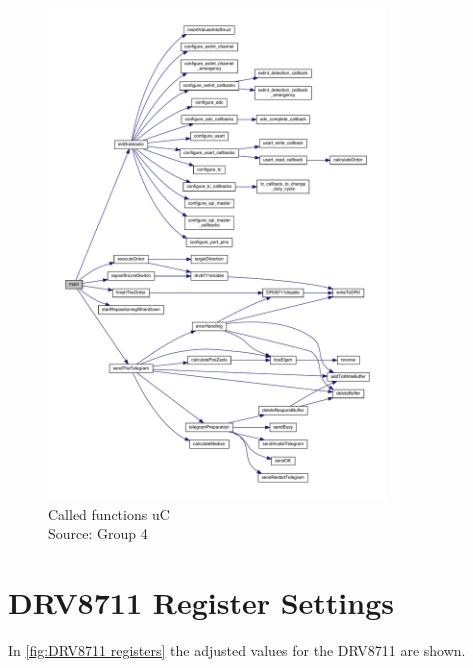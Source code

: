\documentclass[a4paper,12pt]{scrreprt}
\begin{document}
\begin{figure}[H]
  \centering
   \includegraphics[width=0.8\textwidth]{pictures/main_callgraph.pdf}
   \caption[Called functions \acs{uC}]{Called functions \acs{uC}\\
	Source: Group 4  
   }
   \label{fig:main call graph program}
\end{figure} 

\section{DRV8711 Register Settings}\label{DRV8711 register settings}

In \autoref{fig:DRV8711 registers} the adjusted values for the DRV8711 are shown.
\end{document}
